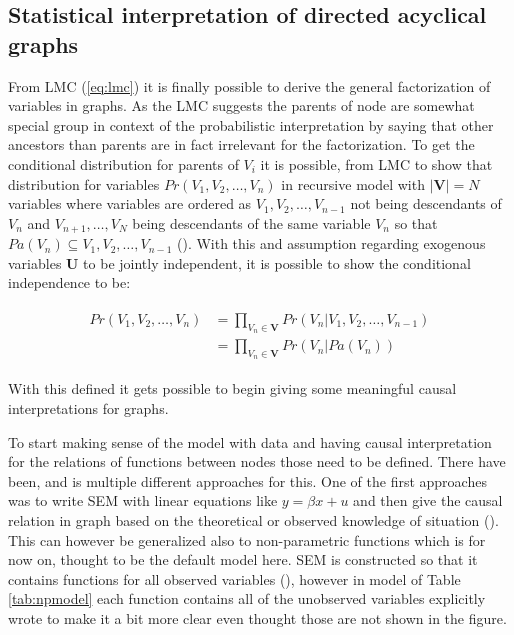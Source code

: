 \documentclass[main=english,12pt,a4paper,pdftex,econ,utf8]{aaltothesis}
\newcommand{\pa}[1]{Pa(#1)}
\newcommand{\vars}{\bm{V}}
\newcommand{\unobs}{\bm{U}}
\begin{document}
\subsection{Statistical interpretation of directed acyclical graphs}

From LMC (\ref{eq:lmc}) it is finally possible to derive the general factorization of variables in graphs. As the LMC suggests the parents of node are somewhat special group in context of the probabilistic interpretation by saying that other ancestors than parents are in fact irrelevant for the factorization. To get the conditional distribution for parents of $V_i$ it is possible, from LMC to show that distribution for variables $Pr(V_1,V_2,\ldots,V_n)$ in recursive model with $|\vars|=N$ variables where variables are ordered as $V_1,V_2,\ldots,V_{n-1}$ not being descendants of $V_n$ and $V_{n+1},\ldots,V_{N}$ being descendants of the same variable $V_n$ so that $\pa{V_n}\subseteq V_1,V_2,\ldots,V_{n-1}$ (\cite{Heckman2015}). With this and assumption regarding exogenous variables $\unobs$ to be jointly independent, it is possible to show the conditional independence to be:

\begin{align} \label{eq:factor}
    \begin{split}
        Pr(V_1,V_2,\ldots,V_{n})&=\prod_{V_{n}\in\vars}Pr(V_{n}|V_1,V_2,\ldots,V_{n-1}) \\
        &=\prod_{V_{n}\in\vars}Pr(V_{n}|\pa{V_{n}})
    \end{split}
\end{align}

\noindent With this defined it gets possible to begin giving some meaningful causal interpretations for graphs.

To start making sense of the model with data and having causal interpretation for the relations of functions between nodes those need to be defined. There have been, and is multiple different approaches for this. One of the first approaches was to write SEM with linear equations like $y=\beta x+u$ and then give the causal relation in graph based on the theoretical or observed knowledge of situation (\cite{Wright1921}). This can however be generalized also to non-parametric functions which is for now on, thought to be the default model here. SEM is constructed so that it contains functions for all observed variables (\cite{Pearl2008}), however in model of Table \ref{tab:npmodel} each function contains all of the unobserved variables explicitly wrote to make it a bit more clear even thought those are not shown in the figure.
\end{document}
